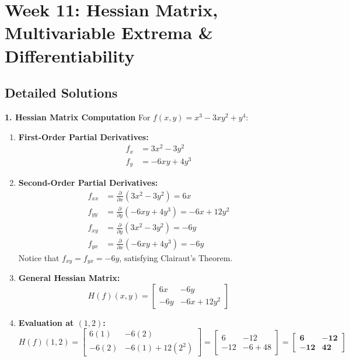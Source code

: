 \section*{Week 11: Hessian Matrix, Multivariable Extrema \& Differentiability}

\subsection*{Detailed Solutions}

\textbf{1. Hessian Matrix Computation}
For $f(x, y) = x^3 - 3xy^2 + y^4$:
\begin{enumerate}
    \item \textbf{First-Order Partial Derivatives:}
    \begin{align*}
    f_x &= 3x^2 - 3y^2 \\
    f_y &= -6xy + 4y^3
    \end{align*}
    \item \textbf{Second-Order Partial Derivatives:}
    \begin{align*}
    f_{xx} &= \frac{\partial}{\partial x}(3x^2 - 3y^2) = 6x \\
    f_{yy} &= \frac{\partial}{\partial y}(-6xy + 4y^3) = -6x + 12y^2 \\
    f_{xy} &= \frac{\partial}{\partial y}(3x^2 - 3y^2) = -6y \\
    f_{yx} &= \frac{\partial}{\partial x}(-6xy + 4y^3) = -6y
    \end{align*}
    Notice that $f_{xy} = f_{yx} = -6y$, satisfying Clairaut's Theorem.
    \item \textbf{General Hessian Matrix:}
    \begin{equation*}
    H(f)(x, y) = \begin{bmatrix} 6x & -6y \\ -6y & -6x + 12y^2 \end{bmatrix}
    \end{equation*}
    \item \textbf{Evaluation at $(1, 2)$:}
    \begin{equation*}
    H(f)(1, 2) = \begin{bmatrix} 6(1) & -6(2) \\ -6(2) & -6(1) + 12(2^2) \end{bmatrix} = \begin{bmatrix} 6 & -12 \\ -12 & -6 + 48 \end{bmatrix} = \mathbf{\begin{bmatrix} 6 & -12 \\ -12 & 42 \end{bmatrix}}
    \end{equation*}
\end{enumerate}

